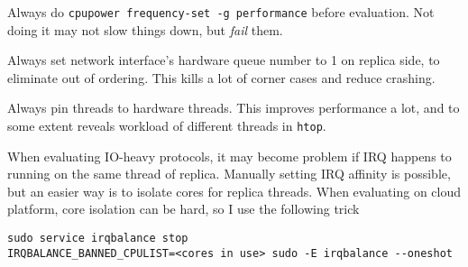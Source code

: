 \documentclass[acmsmall, nonacm, screen]{acmart}
\begin{document}
Always do \verb|cpupower frequency-set -g performance| before evaluation.
Not doing it may not slow things down, but \emph{fail} them.

Always set network interface's hardware queue number to 1 on replica side, to eliminate out of ordering.
This kills a lot of corner cases and reduce crashing.

Always pin threads to hardware threads.
This improves performance a lot, and to some extent reveals workload of different threads in \texttt{htop}.

When evaluating IO-heavy protocols, it may become problem if IRQ happens to running on the same thread of replica.
Manually setting IRQ affinity is possible, but an easier way is to isolate cores for replica threads.
When evaluating on cloud platform, core isolation can be hard, so I use the following trick

\begin{verbatim}
sudo service irqbalance stop
IRQBALANCE_BANNED_CPULIST=<cores in use> sudo -E irqbalance --oneshot
\end{verbatim}
\end{document}
